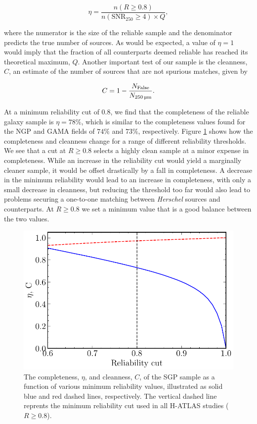 \begin{equation}
    \eta = \frac{n(R \geq 0.8)}{n(\textrm{SNR}_{250} \geq 4) \times Q},
\label{eq:completeness}
\end{equation}

\noindent where the numerator is the size of the reliable sample and the denominator predicts the true number of sources. As would be expected, a value of $\eta = 1$ would imply that the fraction of all counterparts deemed reliable has reached its theoretical maximum, $Q$. Another important test of our sample is the cleanness, $C$, an estimate of the number of sources that are not spurious matches, given by

\begin{equation}
    C = 1 - \frac{N_{\textrm{False}}}{N_{\textrm{250\,\micron}}}.
\label{eq:cleanness}
\end{equation}

At a minimum reliability cut of $0.8$, we find that the completeness of the reliable galaxy sample is $\eta = 78\%$, which is similar to the completeness values found for the NGP and GAMA fields of $74\%$ and $73\%$, respectively. Figure \ref{fig:completeness_and_cleanness} shows how the completeness and cleanness change for a range of different reliability thresholds. We see that a cut at $R \geq 0.8$ selects a highly clean sample at a minor expense in completeness. While an increase in the reliability cut would yield a marginally cleaner sample, it would be offset drastically by a fall in completeness. A decrease in the minimum reliability would lead to an increase in completeness, with only a small decrease in cleanness, but reducing the threshold too far would also lead to problems securing a one-to-one matching between \textit{Herschel} sources and counterparts. At $R \geq 0.8$ we set a minimum value that is a good balance between the two values.

\begin{figure}
    \centering
	\includegraphics[width=0.8\columnwidth]{Figures/completeness_and_cleanness.pdf}
	\caption[Completeness and cleanness of the SGP sample as a function of reliabilty]{The completeness, $\eta$, and cleanness, $C$, of the SGP sample as a function of various minimum reliability values, illustrated as solid blue and red dashed lines, respectively. The vertical dashed line reprents the minimum reliability cut used in all H-ATLAS studies ($R \geq 0.8$).}
	\label{fig:completeness_and_cleanness}
\end{figure}

